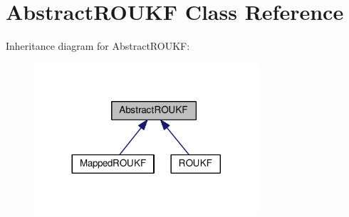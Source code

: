 \hypertarget{classAbstractROUKF}{}\section{Abstract\+R\+O\+U\+KF Class Reference}
\label{classAbstractROUKF}


Inheritance diagram for Abstract\+R\+O\+U\+KF\+:\nopagebreak
\begin{figure}[H]
\begin{center}
\leavevmode
\includegraphics[width=236pt]{classAbstractROUKF__inherit__graph}
\end{center}
\end{figure}
